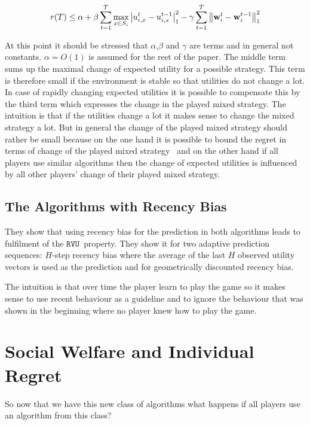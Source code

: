 \documentclass[a4paper]{article}
\theoremstyle{definition}
\newcommand{\myprop}{\ensuremath{\texttt{RVU}}}
\renewcommand{\vec}[1]{\ensuremath{{\bf #1}}}
\begin{document}
 		\begin{equation*}
		r(T) \leq \alpha
		+\beta \sum_{t=1}^{T} \max_{x \in S_i} \left| u_{i,x}^t - u_{i,x}^{t-1} \right|_1^2 -
		\gamma\sum_{t=1}^{T} \left\|\vec{w}_i^{t} - \vec{w}_i^{t-1}\right\|^2_1
		\end{equation*}  

At this point it should be stressed that $\alpha$,$\beta$ and $\gamma$
are terms and in general not constants.
$\alpha = O(1)$ is assumed for the rest of the paper.
The middle term sums up the maximal change of expected utility for a
possible strategy.
This term is therefore small if the environment is stable so that
utilities do not change a lot.
In case of rapidly changing expected utilities it is possible to
compensate this by the third term which expresses the change in the
played mixed strategy.
The intuition is that if the utilities change a lot it makes sense to
change the mixed strategy a lot.
But in general the change of the played mixed strategy should rather
be small because on the one hand it is possible to bound the regret in
terms of change of the played mixed strategy~\cite[p.151, Lemma
7]{Stanford}
and on the other hand if all players use similar algorithms then the
change of expected utilities is influenced by all other players'
change of their played mixed strategy.


\subsection{The Algorithms with Recency Bias}
\label{sec:algor-with-recency}

They show that using recency bias for the prediction in both
algorithms leads to fulfilment of the \myprop~property.
They show it for two adaptive prediction sequences:
$H$-step recency bias where the average of the last $H$ observed
utility vectors is used as the prediction and for geometrically
discounted recency bias.

The intuition is that over time the player learn to play the game so
it makes sense to use recent behaviour as a guideline and to ignore the
behaviour that was shown in the beginning where no player knew how to
play the game.

\section{Social Welfare and Individual Regret}
So now that we have this new class of algorithms what happens if all
players use an algorithm from this class?
\end{document}
